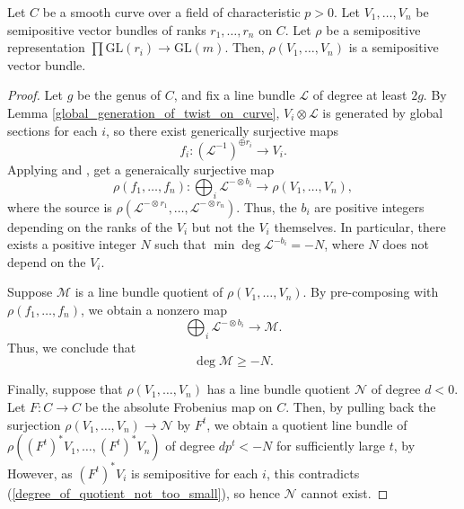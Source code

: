 \begin{lemma}
Let $C$ be a smooth curve over a field of characteristic $p>0$. Let $V_1,\ldots,V_n$ be semipositive vector bundles of ranks $r_1,\ldots,r_n$ on $C$. Let $\rho$ be a semipositive representation $\prod \mathrm{GL}(r_i)\to \mathrm{GL}(m)$. Then, $\rho(V_1,\ldots,V_n)$ is a semipositive vector bundle.
\end{lemma}
\begin{proof}
Let $g$ be the genus of $C$, and fix a line bundle $\mathcal{L}$ of degree at least $2g$.
By Lemma \ref{global_generation_of_twist_on_curve}, $V_i\otimes\mathcal{L}$ is generated by global sections for each $i$, so there exist generically surjective maps
\begin{equation}
f_i:(\mathcal{L}^{-1})^{\oplus r_i}\to V_i.
\end{equation}
Applying  and , get a generaically surjective  map
\begin{equation}
\rho(f_1,\ldots,f_n):\bigoplus_{i}\mathcal{L}^{-\otimes b_i}\to\rho(V_1,\ldots,V_n),
\end{equation}
where the source is $\rho(\mathcal{L}^{-\otimes r_1},\ldots,\mathcal{L}^{-\otimes r_n})$.
Thus, the $b_i$ are positive integers depending on the ranks of the $V_i$ but not the $V_i$ themselves.
In particular, there exists a positive integer $N$ such that $\min\deg\mathcal{L}^{-b_i}=-N$, where $N$ does not depend on the $V_i$.

Suppose $\mathcal{M}$ is a line bundle quotient of $\rho(V_1,\ldots,V_n)$. By pre-composing with $\rho(f_1,\ldots,f_n)$, we obtain a nonzero map
\begin{equation}
\bigoplus_{i}\mathcal{L}^{-\otimes b_i}\to\mathcal{M}.
\end{equation}
Thus, we conclude that
\begin{equation}\label{degree_of_quotient_not_too_small}
\deg\mathcal{M}\ge -N.
\end{equation}

Finally, suppose that $\rho(V_1,\ldots,V_n)$ has a line bundle quotient $\mathcal{N}$ of degree $d<0$. 
Let $F:C\to C$ be the absolute Frobenius map on $C$. 
Then, by pulling back the surjection $\rho(V_1,\ldots,V_n)\to\mathcal{N}$ by $F^t$, we obtain a quotient line bundle of $\rho((F^{t})^{*}V_1,\ldots,(F^{t})^{*}V_n)$ of degree $dp^{t}<-N$ for sufficiently large $t$, by 
However, as $(F^{t})^*V_i$ is semipositive for each $i$, this contradicts (\ref{degree_of_quotient_not_too_small}), so hence $\mathcal{N}$ cannot exist.

\end{proof}

